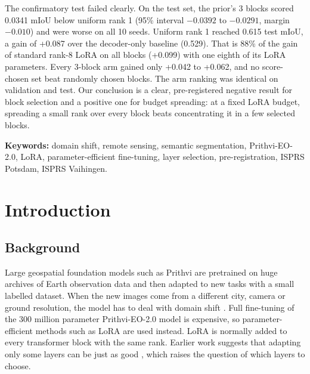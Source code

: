 \documentclass[11pt,a4paper]{report}
\newif\ifblankpage
\newcommand{\blankpage}{%
  \clearpage\blankpagetrue\thispagestyle{empty}\null\clearpage
  \blankpagefalse\addtocounter{page}{-1}}
\begin{document}
The confirmatory test failed clearly. On the test set, the prior's 3 blocks scored 0.0341 mIoU below uniform rank 1 (95\% interval $-0.0392$ to $-0.0291$, margin $-0.010$) and were worse on all 10 seeds. Uniform rank 1 reached 0.615 test mIoU, a gain of +0.087 over the decoder-only baseline (0.529). That is 88\% of the gain of standard rank-8 LoRA on all blocks (+0.099) with one eighth of its LoRA parameters. Every 3-block arm gained only +0.042 to +0.062, and no score-chosen set beat randomly chosen blocks. The arm ranking was identical on validation and test. Our conclusion is a clear, pre-registered negative result for block selection and a positive one for budget spreading: at a fixed LoRA budget, spreading a small rank over every block beats concentrating it in a few selected blocks.

\textbf{Keywords:} domain shift, remote sensing, semantic segmentation, Prithvi-EO-2.0, LoRA, parameter-efficient fine-tuning, layer selection, pre-registration, ISPRS Potsdam, ISPRS Vaihingen.

\blankpage

\tableofcontents
\newpage
\listoffigures
\listoftables
\blankpage

\twocolumn
{}

\chapter{Introduction}

\section{Background}

Large geospatial foundation models such as Prithvi \cite{jakubik2023foundation,szwarcman2024prithvi} are pretrained on huge archives of Earth observation data and then adapted to new tasks with a small labelled dataset. When the new images come from a different city, camera or ground resolution, the model has to deal with domain shift \cite{bendavid2010theory,tuia2016domain}. Full fine-tuning of the 300 million parameter Prithvi-EO-2.0 model is expensive, so parameter-efficient methods such as LoRA \cite{hu2022lora} are used instead. LoRA is normally added to every transformer block with the same rank. Earlier work suggests that adapting only some layers can be just as good \cite{lee2023surgical}, which raises the question of which layers to choose.
\end{document}
